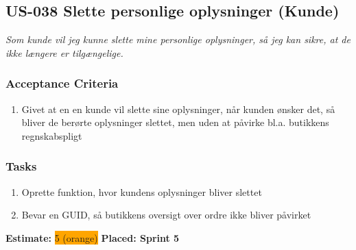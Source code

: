 \subsection{US-038 Slette personlige oplysninger (Kunde)}
\label{sec:US-038}
\textit{Som kunde vil jeg kunne slette mine personlige oplysninger, så jeg kan sikre, at de ikke længere er tilgængelige.}
\subsubsection*{\textbf{Acceptance Criteria}}
\begin{enumerate}
  \item Givet at en en kunde vil slette sine oplysninger, når kunden ønsker det, så bliver de berørte oplysninger slettet, men uden at påvirke bl.a. butikkens regnskabspligt
\end{enumerate}
\subsubsection*{\textbf{Tasks}}
\begin{enumerate}
  \item Oprette funktion, hvor kundens oplysninger bliver slettet
  \item Bevar en GUID, så butikkens oversigt over ordre ikke bliver påvirket
\end{enumerate}
\textbf{Estimate:} \colorbox{orange}{5 (orange)}
\textbf{Placed: Sprint 5}
\par\noindent\dotfill
